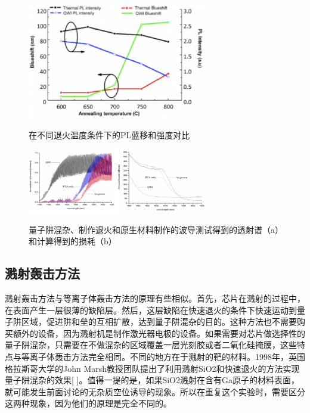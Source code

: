 \documentclass{ZJUthesis}
\begin{document}
\begin{figure}[!ht]
  \centering
  \includegraphics[width=0.7\textwidth]{./Pictures/icp2.eps}\\
  \caption{在不同退火温度条件下的PL蓝移和强度对比}
  \label{fig_icp2}
\end{figure}

\begin{figure}[!ht]
  \centering
  \includegraphics[width=0.7\textwidth]{./Pictures/icp3.eps}\\
  \caption{量子阱混杂、制作退火和原生材料制作的波导测试得到的透射谱（a）和计算得到的损耗（b）}
  \label{fig_icp3}
\end{figure}

\subsection{溅射轰击方法}

溅射轰击方法与等离子体轰击方法的原理有些相似。首先，芯片在溅射的过程中，在表面产生一层很薄的缺陷层。然后，这层缺陷在快速退火的条件下快速运动到量子阱区域，促进阱和垒的互相扩散，达到量子阱混杂的目的。这种方法也不需要购买额外的设备，因为溅射机是制作激光器电极的设备。如果需要对芯片做选择性的量子阱混杂，只需要在不做混杂的区域覆盖一层光刻胶或者二氧化硅掩膜，这些特点与等离子体轰击方法完全相同。不同的地方在于溅射的靶的材料。1998年，英国格拉斯哥大学的John Marsh教授团队提出了利用溅射SiO2和快速退火的方法实现量子阱混杂的效果[ ]。值得一提的是，如果SiO2溅射在含有Ga原子的材料表面，就可能发生前面讨论的无杂质空位诱导的现象。所以在重复这个实验时，需要区分这两种现象，因为他们的原理是完全不同的。
\end{document}

